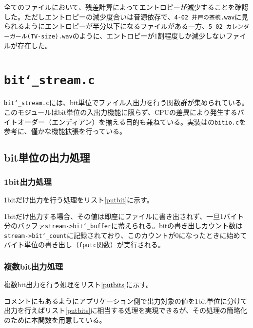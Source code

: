 \documentclass[uplatex,dvipdfmx,b5j,10pt]{jsbook}
\theoremstyle{definition}
\begin{document}
全てのファイルにおいて、残差計算によってエントロピーが減少することを確認した。ただしエントロピーの減少度合いは音源依存で、\texttt{4-02 井戸の茶椀.wav}に見られるようにエントロピーが半分以下になるファイルがある一方、\texttt{5-02 カレンダーガール(TV-size).wav}のように、エントロピーが1割程度しか減少しないファイルが存在した。

\section{\texttt{bit\char`_stream.c}}

\texttt{bit\char`_stream.c}には、bit単位でファイル入出力を行う関数群が集められている。このモジュールはbit単位の入出力機能に限らず、CPUの差異により発生するバイトオーダー（エンディアン）を揃える目的も兼ねている。実装は\cite{okumuracalgo}の\texttt{bitio.c}を参考に、僅かな機能拡張を行っている。

\subsection{bit単位の出力処理}

\subsubsection{1bit出力処理}

1bitだけ出力を行う処理をリスト\ref{putbit}に示す。


1bitだけ出力する場合、その値は即座にファイルに書き出されず、一旦1バイト分のバッファ\texttt{stream->bit\char`_buffer}に蓄えられる。bitの書き出しカウント数は\texttt{stream->bit\char`_count}に記録されており、このカウントが0になったときに始めてバイト単位の書き出し（\texttt{fputc}関数）が実行される。

\subsubsection{複数bit出力処理}

複数bit出力を行う処理をリスト\ref{putbits}に示す。


コメントにもあるようにアプリケーション側で出力対象の値を1bit単位に分けて出力を行えばリスト\ref{putbits}に相当する処理を実現できるが、その処理の簡略化のために本関数を用意している。
\end{document}

